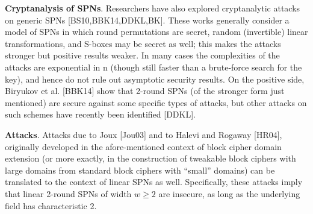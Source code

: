 {\bf Cryptanalysis of SPNs}. Researchers have also explored cryptanalytic attacks
on generic SPNs [BS10,BBK14,DDKL,BK]. These works generally consider a
model of SPNs in which round permutations are secret, random (invertible) linear
transformations, and S-boxes may be secret as well; this makes the attacks
stronger but positive results weaker. In many cases the complexities of the
attacks are exponential in n (though still faster than a brute-force search for
the key), and hence do not rule out asymptotic security results. On the positive
side, Biryukov et al. [BBK14] show that 2-round SPNs (of the stronger form just
mentioned) are secure against some specific types of attacks, but other attacks
on such schemes have recently been identified [DDKL].


{\bf Attacks}. Attacks due to Joux [Jou03] and to Halevi and Rogaway [HR04], originally developed in the afore-mentioned context of block cipher domain extension (or more exactly, in the construction of tweakable block ciphers with large domains from standard block ciphers with ``small'' domains) can be translated to the context of linear SPNs as well. Specifically, these attacks imply that linear 2-round SPNs of width $w\geq 2$ are insecure, as long as the underlying field has characteristic 2.




